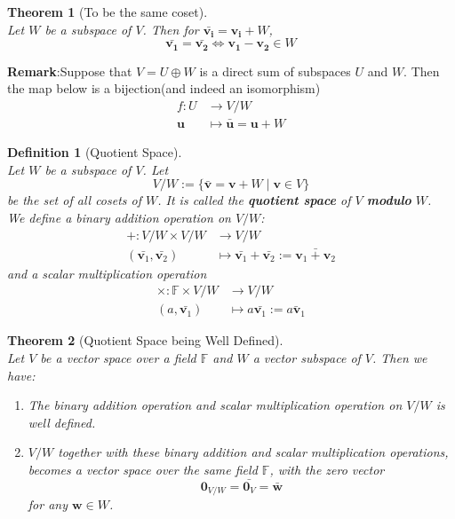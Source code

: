 \documentclass[12pt]{article}
\newtheorem{definition}{Definition}[section]
\newtheorem{theorem}{Theorem}[section]
\theoremstyle{definition}
\begin{document}
\begin{theorem}[To be the same coset]
\hfill\\\normalfont Let $W$ be a subspace of $V$. Then for $\bar{\mathbf{v_i}}=\mathbf{v_i}+W$,
\[
\bar{\mathbf{v_1}}=\bar{\mathbf{v_2}}\Leftrightarrow \mathbf{v_1}-\mathbf{v_2}\in W
\]
\end{theorem}
\textbf{Remark}:Suppose that $V=U\oplus W$ is a direct sum of subspaces $U$ and $W$. Then the map below is a bijection(and indeed an isomorphism)
\[
\begin{aligned}
f:U&\to V/W\\
\mathbf{u}&\mapsto \bar{\mathbf{u}}=\mathbf{u}+W
\end{aligned}
\]
\begin{definition}[Quotient Space]
\hfill\\\normalfont Let $W$ be a subspace of $V$. Let
\[
V/W:=\{\bar{\mathbf{v}}=\mathbf{v}+W\mid\mathbf{v}\in V\}
\]
be the set of all cosets of $W$. It is called the \textbf{quotient space} of $V$ \textbf{modulo} $W$.\\
We define a binary addition operation on $V/W$:
\[
\begin{aligned}
+:V/W\times V/W&\to V/W\\
(\bar{\mathbf{v}_1},\bar{\mathbf{v}_2})&\mapsto \bar{\mathbf{v}_1}+\bar{\mathbf{v}_2}:=\bar{\mathbf{v}_1+\mathbf{v}_2}
\end{aligned}
\]
and a scalar multiplication operation
\[
\begin{aligned}
\times:\mathbb{F}\times V/W&\to V/W\\
(a,\bar{\mathbf{v}_1})&\mapsto a\bar{\mathbf{v}_1}:=\bar{a\mathbf{v}_1}
\end{aligned}
\]
\end{definition}
\begin{theorem}[Quotient Space being Well Defined]
\hfill\\\normalfont Let $V$ be a vector space over a field $\mathbb{F}$ and $W$ a vector subspace of $V$. Then we have:
\begin{enumerate}[label=(\arabic*)]
\item The binary addition operation and scalar multiplication operation on $V/W$ is well defined.
\item $V/W$ together with these binary addition and scalar multiplication operations, becomes a vector space over the same field $\mathbb{F}$, with the zero vector
\[
\mathbf{0}_{V/W}=\bar{\mathbf{0}_V}=\bar{\mathbf{w}}
\]
for any $\mathbf{w}\in W$.
\end{enumerate}
\end{theorem}
\end{document}
